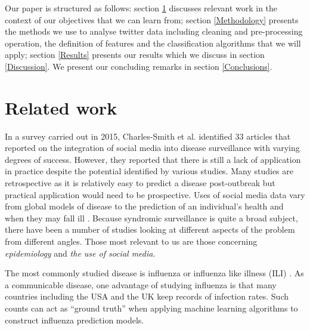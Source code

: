 \documentclass[10pt,letterpaper]{article}
\begin{document}

Our paper is structured as follows:  section \ref{RelatedWork} discusses relevant work in the context of our objectives that we can learn from; section \ref{Methodology} presents the methods we use to analyse twitter data including cleaning and pre-processing operation, the definition of features and the classification algorithms that we will apply;  section \ref{Results} presents our results which we discuss in section \ref{Discussion}.  We present our concluding remarks in section \ref{Conclusions}.

\section{Related work} 
\label{RelatedWork}
In a survey carried out in 2015, Charles-Smith et al. \cite{REF42} identified 33 articles that reported on the integration of social media into disease surveillance with varying degrees of success.  However, they reported that there is still a lack of application in practice despite the potential identified by various studies.  Many studies are retrospective as it is relatively easy to predict a disease post-outbreak but practical application would need to be prospective.    Uses of social media data vary from global models of disease \cite{REF80} to the prediction of an individual's health and when they may fall ill \cite{REF43}. Because syndromic surveillance is quite a broad subject, there have been a number of studies looking at different aspects of the problem from different angles. Those most relevant to us are those concerning \textit{epidemiology} and \textit{the use of social media}. 

The most commonly studied disease is influenza or influenza like illness (ILI) \cite{REF51}. As a communicable disease, one advantage of studying influenza is that many countries including the USA and the UK keep records of infection rates. Such counts can act as ``ground truth'' when applying machine learning algorithms to construct influenza prediction models.
\end{document}

